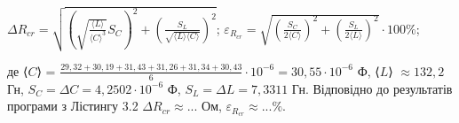 \documentclass[12pt,a4paper]{article}
\begin{document}
    \begin{center}
    
        $\displaystyle \Delta R_{cr} = \sqrt{\left( \sqrt{\frac{\text{⟨}L\text{⟩}}{\text{⟨}C\text{⟩}^3}} S_C\right)^2 + \left( \frac{S_L}{\sqrt{\text{⟨}L\text{⟩}\text{⟨}C\text{⟩}}} \right)^2}$;
        $\displaystyle \varepsilon_{R_{cr}} = \sqrt{\left( \frac{S_C}{2\text{⟨}C\text{⟩}} \right)^2 + \left( \frac{S_L}{2\text{⟨}L\text{⟩}} \right)^2} \cdot 100 \%$;

    \end{center}

    \newpage

    де ⟨$C$⟩ = $\displaystyle \frac{29,32 + 30,19 + 31,43 + 31,26 + 31,34 + 30,43}{6} \cdot 10^{-6} = 30,55 \cdot 10^{-6}$ Ф, ⟨$L$⟩ $\approx 132,2$ Гн, $S_C = \Delta C = 4,2502 \cdot 10^{-6}$ Ф, $S_L = \Delta L = 7,3311$ Гн.
    Відповідно до результатів програми з Лістингу 3.2 $\Delta R_{cr} \approx ...$ Ом, $\varepsilon_{R_{cr}} \approx ... \%$.

\end{document}

